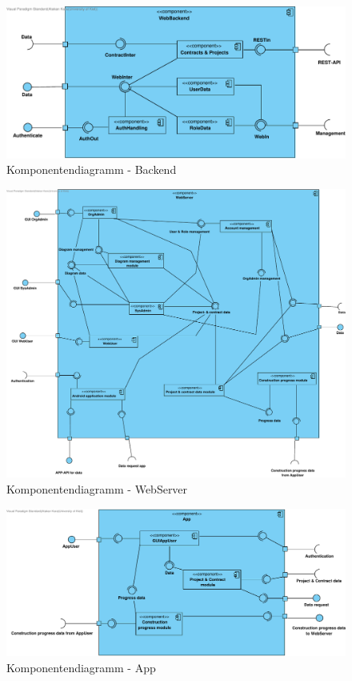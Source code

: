 \begin{figure}[h]
	\centering
	\includegraphics[width=16cm]{img/diagrams/cp_backend.pdf}	
	\caption{Komponentendiagramm - Backend}
	\label{fig:komponentendiagramm-backend}
\end{figure}

\begin{figure}[h]
	\centering
	\includegraphics[width=16cm]{img/diagrams/Component-WebServer.pdf}	
	\caption{Komponentendiagramm - WebServer}
	\label{fig:komponentendiagramm-webserver}
\end{figure}

\begin{figure}[h]
	\centering
	\includegraphics[width=16cm]{img/diagrams/Component-App.pdf}	
	\caption{Komponentendiagramm - App}
	\label{fig:komponentendiagramm-app}
\end{figure}

